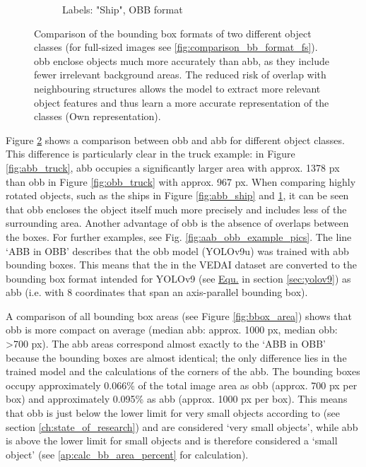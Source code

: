\begin{figure}[h]
\begin{subfigure}[b]{0.45\textwidth}
        \caption{Labels: "Ship", OBB format}
        \label{fig:obb_ship}
    \end{subfigure}  
    \caption[Comparison of the bounding box formats of two different object classes]{Comparison of the bounding box formats of two different object classes (for full-sized images see \ref{fig:comparison_bb_format_fs}). \acrshort{obb} enclose objects much more accurately than \acrshort{abb}, as they include fewer irrelevant background areas. The reduced risk of overlap with neighbouring structures allows the model to extract more relevant object features and thus learn a more accurate representation of the classes (Own representation).
}
    \label{fig:comparison_bb_format}
\end{figure}


Figure \ref{fig:comparison_bb_format} shows a comparison between \acrshort{obb} and \acrshort{abb} for different object classes. This difference is particularly clear in the truck example: in Figure \ref{fig:abb_truck}, \acrshort{abb} occupies a significantly larger area with approx. 1378 px than \acrshort{obb} in Figure \ref{fig:obb_truck} with approx. 967 px. When comparing highly rotated objects, such as the ships in Figure \ref{fig:abb_ship} and \ref{fig:obb_ship}, it can be seen that \acrshort{obb} encloses the object itself much more precisely and includes less of the surrounding area. Another advantage of \acrshort{obb} is the absence of overlaps between the boxes. For further examples, see Fig. \ref{fig:aab_obb_example_pics}. The line ‘ABB in OBB’ describes that the \acrshort{obb} model (\acrshort{YOLO}v9u) was trained with \acrshort{abb} bounding boxes. This means that the  in the \acrshort{VEDAI} dataset are converted to the bounding box format intended for \acrshort{YOLO}v9 (see \hyperlink{eq:yolov9u} {Equ.} in section \ref{sec:yolov9}) as \acrshort{abb} (i.e. with 8 coordinates that span an axis-parallel bounding box).
 

A comparison of all bounding box areas (see Figure \ref{fig:bbox_area}) shows that \acrshort{obb} is more compact on average (median \acrshort{abb}: approx. 1000 px, median \acrshort{obb}: >700 px). The \acrshort{abb} areas correspond almost exactly to the ‘ABB in OBB’ because the bounding boxes are almost identical; the only difference lies in the trained model and the calculations of the corners of the \acrshort{abb}. The bounding boxes occupy approximately 0.066\% of the total image area as \acrshort{obb} (approx. 700 px per box) and approximately 0.095\% as \acrshort{abb} (approx. 1000 px per box). This means that \acrshort{obb} is just below the lower limit for very small objects according to \citeauthor {Chen2017} \cite{Chen2017} (see section \ref{ch:state_of_research}) and are considered ‘very small objects’, while \acrshort{abb} is above the lower limit for small objects and is therefore considered a ‘small object’ (see \ref{ap:calc_bb_area_percent} for calculation).




